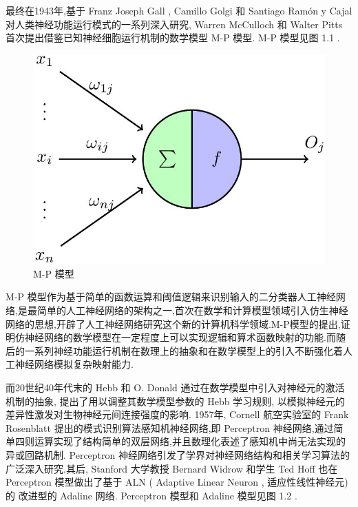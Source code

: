 最终在1943年,基于 Franz Joseph Gall , Camillo Golgi 和 Santiago Ramón y Cajal 对人类神经功能运行模式的一系列深入研究, Warren McCulloch 和 Walter Pitts 首次提出借鉴已知神经细胞运行机制的数学模型 M-P 模型. M-P 模型见图 1.1 .

\begin{figure}[H]
	\centering
	\includegraphics[scale=0.35]{Figures/mpmodel.png}
	\caption{M-P 模型}
\end{figure}

M-P 模型作为基于简单的函数运算和阈值逻辑来识别输入的二分类器人工神经网络,是最简单的人工神经网络的架构之一,首次在数学和计算模型领域引入仿生神经网络的思想,开辟了人工神经网络研究这个新的计算机科学领域.M-P模型的提出,证明仿神经网络的数学模型在一定程度上可以实现逻辑和算术函数映射的功能.而随后的一系列神经功能运行机制在数理上的抽象和在数学模型上的引入不断强化着人工神经网络模拟复杂映射能力.

而20世纪40年代末的 Hebb 和 O. Donald 通过在数学模型中引入对神经元的激活机制的抽象, 提出了用以调整其数学模型参数的 Hebb 学习规则, 以模拟神经元的差异性激发对生物神经元间连接强度的影响\cite{hebb}. 1957年, Cornell 航空实验室的 Frank Rosenblatt 提出的模式识别算法感知机神经网络,即 Perceptron 神经网络,通过简单四则运算实现了结构简单的双层网络,并且数理化表述了感知机中尚无法实现的异或回路机制\cite{perceptron}. Perceptron 神经网络引发了学界对神经网络结构和相关学习算法的广泛深入研究.其后, Stanford 大学教授 Bernard Widrow 和学生 Ted Hoff 也在 Perceptron 模型做出了基于 ALN ( Adaptive Linear Neuron , 适应性线性神经元)的 改进型的 Adaline 网络\cite{adaline}. Perceptron 模型和 Adaline 模型见图 1.2 .

